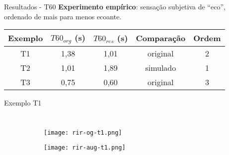 \begin{frame}{Resultados - T60}
    \textbf{Experimento empírico}: sensação subjetiva de “eco”, ordenado de mais para menos ecoante.
    \vspace{1cm}

    \begin{table} [H]
        \centering
        \begin{tabular}{c|c|c|c|c}
    
            \textbf{Exemplo} & 
            \textbf{$T60_{org}$ (s)} & 
            \textbf{$T60_{res}$ (s)} & 
            \textbf{Comparação} &
            \textbf{Ordem} \\
            \hline 
    
            T1 & 1,38 & 1,01 & original & 2 \\
            T2 & 1,01 & 1,89 & simulado & 1 \\
            T3 & 0,75 & 0,60 & original & 3 \\
    
        \end{tabular}
    \end{table}
\end{frame}

\begin{frame}{Exemplo T1}
    \begin{columns}
        \begin{figure}
            \begin{subfigure}{\textwidth}
                \centering
                \texttt{[image: rir-og-t1.png]}
            \end{subfigure}
            \begin{subfigure}{\textwidth}
                \centering
                \texttt{[image: rir-aug-t1.png]}
            \end{subfigure}
        \end{figure}
    \end{columns}
        
\end{frame}


